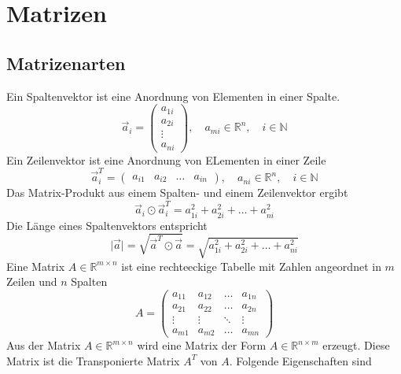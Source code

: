 \section{Matrizen}
\subsection{Matrizenarten}
Ein Spaltenvektor ist eine Anordnung von Elementen in einer Spalte.
\begin{equation}
\boxed{\overrightarrow{a}_i=\begin{pmatrix}a_{1i}\\a_{2i}\\\vdots\\a_{ni}\end{pmatrix},\quad a_{mi}\in \mathbb{R}^n, \quad i\in \mathbb{N}}
\end{equation}
Ein Zeilenvektor ist eine Anordnung von ELementen in einer Zeile
\begin{equation}
\boxed{\overrightarrow{a}_i^T=\begin{pmatrix}a_{i1}&a_{i2}&\dotso&a_{in}\end{pmatrix},\quad a_{ni}\in \mathbb{R}^n,\quad i\in\mathbb{N}}
\end{equation}
Das Matrix-Produkt aus einem Spalten- und einem Zeilenvektor ergibt 
\begin{equation}
\boxed{\overrightarrow{a}_i\odot \overrightarrow{a}_i^T=a_{1i}^2+a_{2i}^2+\dotso+a_{ni}^2}
\end{equation}
Die Länge eines Spaltenvektors entspricht
\begin{equation}
\boxed{\Big\vert\overrightarrow{a}\Big\vert=\sqrt{\overrightarrow{a}^T\odot \overrightarrow{a}}=\sqrt{a_{1i}^2+a_{2i}^2+\dotso+a_{ni}^2}}
\end{equation}
Eine Matrix $A\in\mathbb{R}^{m\times n}$ ist eine rechteeckige Tabelle mit Zahlen angeordnet in $m$ Zeilen und $n$ Spalten
\begin{equation}
\boxed{A=\begin{pmatrix}a_{11}&a_{12}&\dotso&a_{1n}\\a_{21}&a_{22}&\dotso&a_{2n}\\\vdots&\vdots&\ddots&\vdots\\a_{m1}&a_{m2}&\dotso&a_{mn}\end{pmatrix}}
\end{equation}
Aus der Matrix $A\in\mathbb{R}^{m\times n}$ wird eine Matrix der Form $A\in\mathbb{R}^{n\times m}$ erzeugt. Diese Matrix ist die Transponierte Matrix $A^T$ von $A$. Folgende Eigenschaften sind
